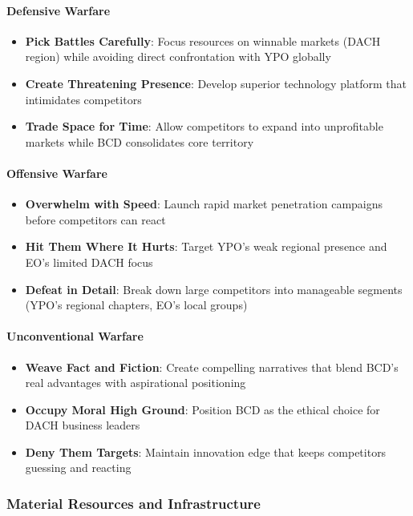 \paragraph{Defensive Warfare}
\begin{itemize}
    \item \textbf{Pick Battles Carefully}: Focus resources on winnable markets (DACH region) while avoiding direct confrontation with YPO globally
    \item \textbf{Create Threatening Presence}: Develop superior technology platform that intimidates competitors
    \item \textbf{Trade Space for Time}: Allow competitors to expand into unprofitable markets while BCD consolidates core territory
\end{itemize}

\paragraph{Offensive Warfare}
\begin{itemize}
    \item \textbf{Overwhelm with Speed}: Launch rapid market penetration campaigns before competitors can react
    \item \textbf{Hit Them Where It Hurts}: Target YPO's weak regional presence and EO's limited DACH focus
    \item \textbf{Defeat in Detail}: Break down large competitors into manageable segments (YPO's regional chapters, EO's local groups)
\end{itemize}

\paragraph{Unconventional Warfare}
\begin{itemize}
    \item \textbf{Weave Fact and Fiction}: Create compelling narratives that blend BCD's real advantages with aspirational positioning
    \item \textbf{Occupy Moral High Ground}: Position BCD as the ethical choice for DACH business leaders
    \item \textbf{Deny Them Targets}: Maintain innovation edge that keeps competitors guessing and reacting
\end{itemize}

\subsubsection{Material Resources and Infrastructure}

